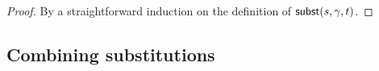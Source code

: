 \documentclass{lmcs}
\theoremstyle{theorem}\newtheorem{theorem}{Theorem}
\theoremstyle{theorem}\newtheorem{lemma}[theorem]{Lemma}
\theoremstyle{theorem}\newtheorem{corollary}[theorem]{Corollary}
\theoremstyle{definition}\newtheorem{definition}[theorem]{Definition}
\theoremstyle{definition}\newtheorem{example}[theorem]{Example}
\newcommand{\FV}{\mathit{FV}}
\newcommand{\domain}{\mathtt{dom}}
\newcommand{\identifier}[1]{\mathtt{#1}}
\newcommand{\afun}{\identifier{f}}
\newcommand{\avar}{x}
\newcommand{\bvar}{y}
\newcommand{\cvar}{z}
\newcommand{\Avar}{X}
\newcommand{\abs}[2]{\lambda #1.#2}
\newcommand{\meta}[2]{#1\langle#2\rangle}
\newcommand{\tuple}[2]{\llparenthesis #1,\dots,#2 \rrparenthesis}
\begin{document}
\begin{proof}
By a straightforward induction on the definition of $\mathsf{subst}(s,\gamma,t)$.
\end{proof}

\subsection{Combining substitutions}
\end{document}
